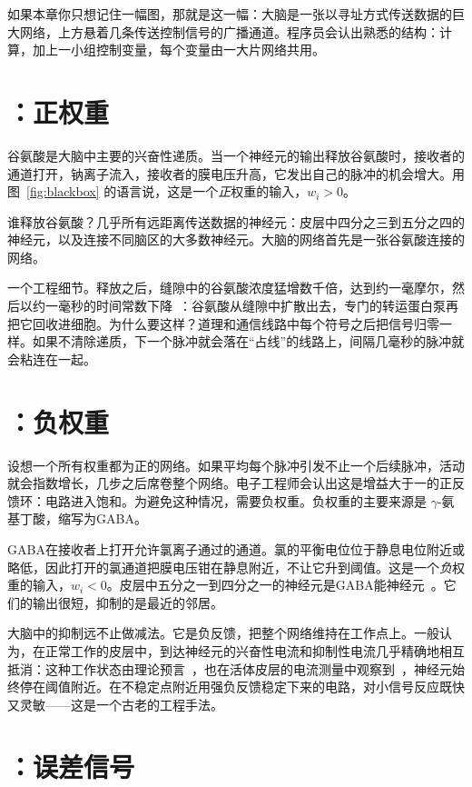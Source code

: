 如果本章你只想记住一幅图，那就是这一幅：大脑是一张以寻址方式传送数据的巨大网络，上方悬着几条传送控制信号的广播通道。程序员会认出熟悉的结构：计算，加上一小组控制变量，每个变量由一大片网络共用。

\section{：正权重}

谷氨酸是大脑中主要的兴奋性递质。当一个神经元的输出释放谷氨酸时，接收者的通道打开，钠离子流入，接收者的膜电压升高，它发出自己的脉冲的机会增大。用图~\ref{fig:blackbox} 的语言说，这是一个\emph{正}权重的输入，$w_i>0$。

谁释放谷氨酸？几乎所有远距离传送数据的神经元：皮层中四分之三到五分之四的神经元，以及连接不同脑区的大多数神经元。大脑的网络首先是一张谷氨酸连接的网络。

一个工程细节。释放之后，缝隙中的谷氨酸浓度猛增数千倍，达到约一毫摩尔，然后以约一毫秒的时间常数下降~\cite{Clements1992}：谷氨酸从缝隙中扩散出去，专门的转运蛋白泵再把它回收进细胞。为什么要这样？道理和通信线路中每个符号之后把信号归零一样。如果不清除递质，下一个脉冲就会落在“占线”的线路上，间隔几毫秒的脉冲就会粘连在一起。

\section{：负权重}

设想一个所有权重都为正的网络。如果平均每个脉冲引发不止一个后续脉冲，活动就会指数增长，几步之后席卷整个网络。电子工程师会认出这是增益大于一的正反馈环：电路进入饱和。为避免这种情况，需要负权重。负权重的主要来源是 $\gamma$-氨基丁酸，缩写为GABA。

GABA在接收者上打开允许氯离子通过的通道。氯的平衡电位位于静息电位附近或略低，因此打开的氯通道把膜电压钳在静息附近，不让它升到阈值。这是一个\emph{负}权重的输入，$w_i<0$。皮层中五分之一到四分之一的神经元是GABA能神经元~\cite{Hendry1987}。它们的输出很短，抑制的是最近的邻居。

大脑中的抑制远不止做减法。它是负反馈，把整个网络维持在工作点上。一般认为，在正常工作的皮层中，到达神经元的兴奋性电流和抑制性电流几乎精确地相互抵消：这种工作状态由理论预言~\cite{vanVreeswijk1996}，也在活体皮层的电流测量中观察到~\cite{Haider2006}，神经元始终停在阈值附近。在不稳定点附近用强负反馈稳定下来的电路，对小信号反应既快又灵敏——这是一个古老的工程手法。

\section{：误差信号}

